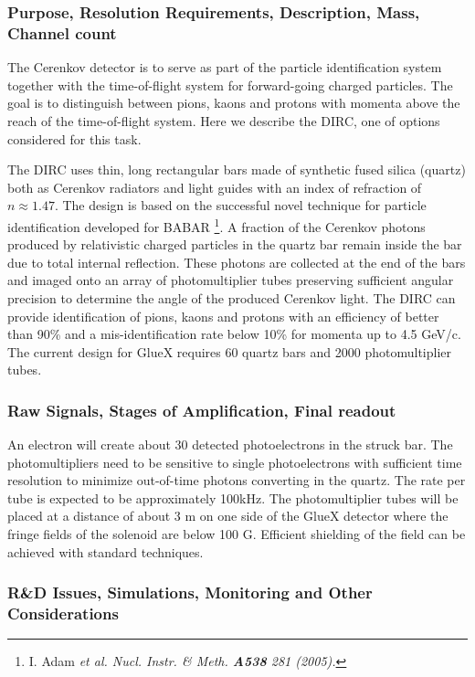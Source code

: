 \subsubsection*{Purpose, Resolution Requirements, Description, Mass, Channel count}

The Cerenkov detector is to serve as part of the particle identification system
together with the time-of-flight system for forward-going charged particles.
The goal is to distinguish between pions, kaons and protons with
momenta above the reach of the time-of-flight system. Here we describe the DIRC,
one of options considered for this task.

The DIRC uses thin, long rectangular bars made of synthetic fused silica
(quartz) both as Cerenkov radiators and light guides  with
an index of refraction of $n \approx 1.47$. The design is based on the
successful novel technique for particle identification developed for
BABAR \footnote{I. Adam \em{et al.} Nucl. Instr. \& Meth. \textbf{A538} 281 (2005).}.
A fraction of the Cerenkov photons produced by relativistic charged particles 
in the quartz bar remain inside the bar due to total internal reflection.
These photons are collected at the end of the bars and imaged onto 
an array of photomultiplier tubes preserving sufficient angular precision to
determine the angle of the produced Cerenkov light. The DIRC can provide 
identification of pions, kaons and protons with an efficiency of better 
than 90\% and a mis-identification rate below 10\% for momenta up to 4.5 GeV/c. 
The current design for GlueX requires 60 quartz bars and 2000 photomultiplier 
tubes.

\subsubsection*{Raw Signals, Stages of Amplification, Final readout}

An electron will create about 30 detected photoelectrons in the struck bar.
The photomultipliers need to be sensitive to single photoelectrons
with sufficient time resolution to minimize out-of-time photons converting
in the quartz. The rate per tube is expected to be approximately 100kHz.
The photomultiplier tubes will be placed at a distance of
about 3 m on one side of the GlueX detector where the fringe fields of 
the solenoid are below 100 G. Efficient shielding of the field can be achieved
with standard techniques.


\subsubsection*{R\&D Issues, Simulations, Monitoring and Other Considerations}

